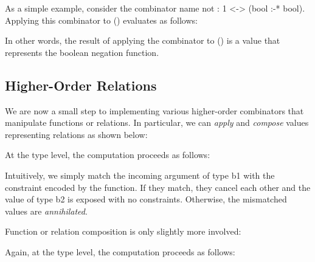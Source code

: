 \documentclass{llncs}
\begin{document}

As a simple example, consider the combinator 
{{name not : 1 <-> (bool :-* bool)}}. Applying this 
combinator to {{ () }} evaluates as follows:


\noindent In other words, the result of applying the combinator to {{ () }}
is a value that represents the boolean negation function. 

\subsection{Higher-Order Relations}

We are now a small step to implementing various higher-order
combinators that manipulate functions or relations. In particular, we
can \emph{apply} and \emph{compose} values representing relations as
shown below:


\noindent At the type level, the computation proceeds as follows:

\noindent Intuitively, we simply match the incoming argument of type {{b1}} with
the constraint encoded by the function. If they match, they cancel
each other and the value of type {{b2}} is exposed with no
constraints. Otherwise, the mismatched values are \emph{annihilated}.

Function or relation composition is only slightly more involved:


\noindent Again, at the type level, the computation proceeds as follows:
\end{document}
